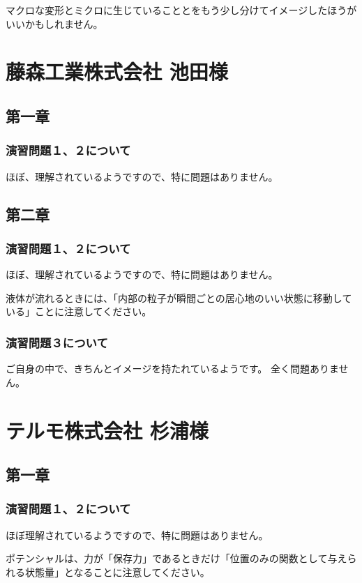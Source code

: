 \documentclass[uplatex,dvipdfmx,a4paper,11pt]{jsreport}
\begin{document}
マクロな変形とミクロに生じていることとをもう少し分けてイメージしたほうがいいかもしれません。

\clearpage

\section*{藤森工業株式会社 池田様}
\subsection*{第一章}
\subsubsection*{演習問題１、２について}
ほぼ、理解されているようですので、特に問題はありません。


\subsection*{第二章}
\subsubsection*{演習問題１、２について}
ほぼ、理解されているようですので、特に問題はありません。

液体が流れるときには、「内部の粒子が瞬間ごとの居心地のいい状態に移動している」ことに注意してください。

\subsubsection*{演習問題３について}

ご自身の中で、きちんとイメージを持たれているようです。
全く問題ありません。

\clearpage

\section*{テルモ株式会社 杉浦様}
\subsection*{第一章}
\subsubsection*{演習問題１、２について}
ほぼ理解されているようですので、特に問題はありません。

ポテンシャルは、力が「保存力」であるときだけ「位置のみの関数として与えられる状態量」となることに注意してください。
\end{document}
